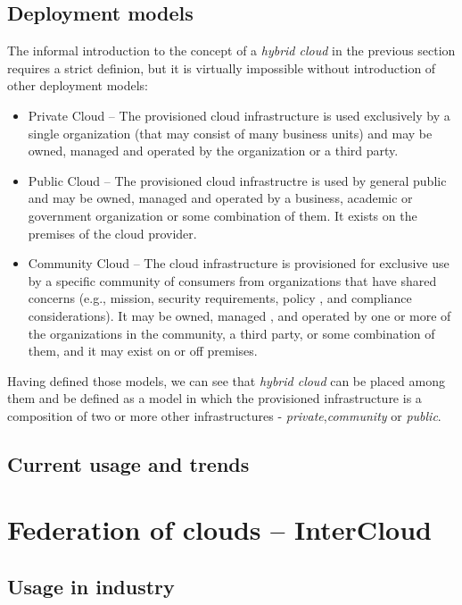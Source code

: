 \subsection{Deployment models}
The informal introduction to the concept of a \emph{hybrid cloud} in the previous section requires a strict definion, but it is virtually impossible without introduction of other deployment models:
\begin{itemize}
  \item Private Cloud -- The provisioned cloud infrastructure is used exclusively by a single organization (that may consist of many business units) and may be owned, managed and operated by the organization or a third party.
  \item Public Cloud -- The provisioned cloud infrastructre is used by general public and may be owned, managed and operated by a business, academic or government organization or some combination of them. It exists on the premises of the cloud provider.
  \item Community Cloud -- The cloud infrastructure is provisioned for exclusive use by a specific community of consumers from organizations that have shared concerns (e.g., mission, security requirements, policy , and compliance considerations). It may be owned, managed , and operated by one or more of the organizations in the community, a third party, or some combination of them, and it may exist on or off premises. 
\end{itemize}
Having defined those models, we can see that \emph{hybrid cloud} can be placed among them and be defined as a model in which the provisioned infrastructure is a composition of two or more other infrastructures - \emph{private},\emph{community} or \emph{public}.

\subsection{Current usage and trends}

\section{Federation of clouds -- InterCloud}

\subsection{Usage in industry}

